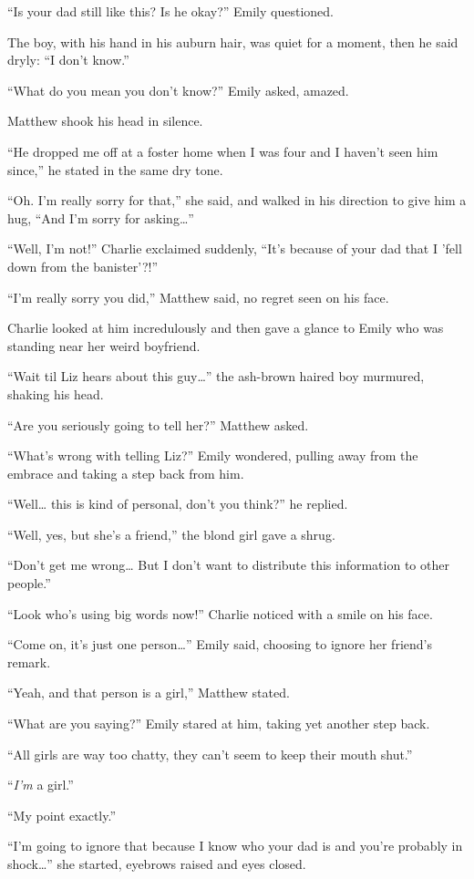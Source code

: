 “Is your dad still like this? Is he okay?” Emily questioned.

The boy, with his hand in his auburn hair, was quiet for a moment, then he said dryly: “I don't know.”

“What do you mean you don't know?” Emily asked, amazed.

Matthew shook his head in silence.

“He dropped me off at a foster home when I was four and I haven't seen him since,” he stated in the same dry tone.

“Oh. I'm really sorry for that,” she said, and walked in his direction to give him a hug, “And I'm sorry for asking…”

“Well, I'm not!” Charlie exclaimed suddenly, “It's because of your dad that I 'fell down from the banister'?!”

“I'm really sorry you did,” Matthew said, no regret seen on his face.

Charlie looked at him incredulously and then gave a glance to Emily who was standing near her weird boyfriend.

“Wait til Liz hears about this guy…” the ash-brown haired boy murmured, shaking his head.

“Are you seriously going to tell her?” Matthew asked.

“What's wrong with telling Liz?” Emily wondered, pulling away from the embrace and taking a step back from him.

“Well… this is kind of personal, don't you think?” he replied.

“Well, yes, but she's a friend,” the blond girl gave a shrug.

“Don't get me wrong… But I don't want to distribute this information to other people.”

“Look who's using big words now!” Charlie noticed with a smile on his face.

“Come on, it's just one person…” Emily said, choosing to ignore her friend's remark.

“Yeah, and that person is a girl,” Matthew stated.

“What are you saying?” Emily stared at him, taking yet another step back.

“All girls are way too chatty, they can't seem to keep their mouth shut.”

“\textit{I'm} a girl.”

“My point exactly.”

“I'm going to ignore that because I know who your dad is and you're probably in shock…” she started, eyebrows raised and eyes closed.

